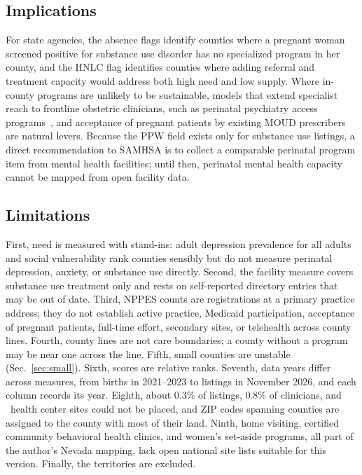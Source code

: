 \documentclass[10pt,twocolumn,letterpaper]{article}
\begin{document}
\subsection{Implications}
For state agencies, the absence flags identify counties where a pregnant woman screened positive for substance use disorder has no specialized program in her county, and the HNLC flag identifies counties where adding referral and treatment capacity would address both high need and low supply. Where in-county programs are unlikely to be sustainable, models that extend specialist reach to frontline obstetric clinicians, such as perinatal psychiatry access programs~\cite{byatt2016}, and acceptance of pregnant patients by existing MOUD prescribers~\cite{patrick2020} are natural levers. Because the PPW field exists only for substance use listings, a direct recommendation to SAMHSA is to collect a comparable perinatal program item from mental health facilities; until then, perinatal mental health capacity cannot be mapped from open facility data.

\subsection{Limitations}
First, need is measured with stand-ins: adult depression prevalence for all adults and social vulnerability rank counties sensibly but do not measure perinatal depression, anxiety, or substance use directly. Second, the facility measure covers substance use treatment only and rests on self-reported directory entries that may be out of date. Third, NPPES counts are registrations at a primary practice address; they do not establish active practice, Medicaid participation, acceptance of pregnant patients, full-time effort, secondary sites, or telehealth across county lines. Fourth, county lines are not care boundaries; a county without a program may be near one across the line. Fifth, small counties are unstable (Sec.~\ref{sec:small}). Sixth, scores are relative ranks. Seventh, data years differ across measures, from births in 2021--2023 to listings in November 2026, and each column records its year. Eighth, about 0.3\% of listings, 0.8\% of clinicians, and \HCUnplaced\ health center sites could not be placed, and ZIP codes spanning counties are assigned to the county with most of their land. Ninth, home visiting, certified community behavioral health clinics, and women's set-aside programs, all part of the author's Nevada mapping, lack open national site lists suitable for this version. Finally, the territories are excluded.
\end{document}
